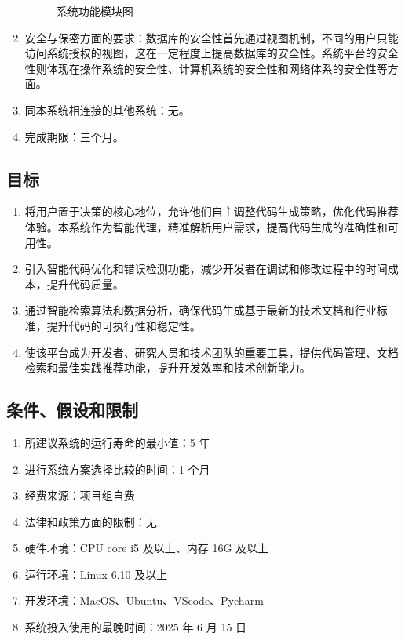 \documentclass[
    report,     %
    oneside,    %
    UTF8,       %
    zihao=-4    %
]{config} %
\begin{document}
\begin{enumerate}[label=(\arabic*)]
\begin{figure}[h]
        \caption{系统功能模块图} %
        \label{fig:system-module} %
    \end{figure}
    \item 安全与保密方面的要求：数据库的安全性首先通过视图机制，不同的用户只能访问系统授权的视图，这在一定程度上提高数据库的安全性。系统平台的安全性则体现在操作系统的安全性、计算机系统的安全性和网络体系的安全性等方面。
    \item 同本系统相连接的其他系统：无。
    \item 完成期限：三个月。
\end{enumerate}

\subsection{目标}
\begin{enumerate}[label=(\arabic*)]
    \item 将用户置于决策的核心地位，允许他们自主调整代码生成策略，优化代码推荐体验。本系统作为智能代理，精准解析用户需求，提高代码生成的准确性和可用性。
    \item 引入智能代码优化和错误检测功能，减少开发者在调试和修改过程中的时间成本，提升代码质量。
    \item 通过智能检索算法和数据分析，确保代码生成基于最新的技术文档和行业标准，提升代码的可执行性和稳定性。
    \item 使该平台成为开发者、研究人员和技术团队的重要工具，提供代码管理、文档检索和最佳实践推荐功能，提升开发效率和技术创新能力。
\end{enumerate}

\subsection{条件、假设和限制}
\begin{enumerate}[label=(\arabic*)]
    \item 所建议系统的运行寿命的最小值：5 年
    \item 进行系统方案选择比较的时间：1 个月
    \item 经费来源：项目组自费
    \item 法律和政策方面的限制：无
    \item 硬件环境：CPU core i5 及以上、内存 16G 及以上
    \item 运行环境：Linux 6.10 及以上
    \item 开发环境：MacOS、Ubuntu、VScode、Pycharm
    \item 系统投入使用的最晚时间：2025 年 6 月 15 日
\end{enumerate}
\end{document}
